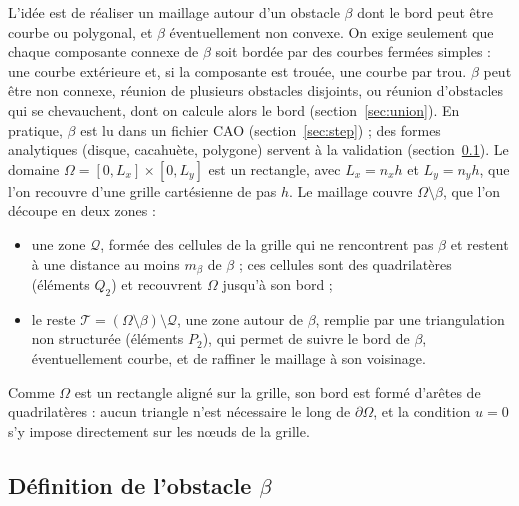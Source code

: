\documentclass[11pt,a4paper]{article}
\begin{document}
L'idée est de réaliser un maillage autour d'un obstacle $\beta$ dont le
bord peut être courbe ou polygonal, et $\beta$ éventuellement non convexe.
On exige seulement que chaque composante connexe de $\beta$ soit bordée par
des courbes fermées simples : une courbe extérieure et, si la composante est
trouée, une courbe par trou. $\beta$ peut être non connexe, réunion de
plusieurs obstacles disjoints, ou réunion d'obstacles qui se chevauchent,
dont on calcule alors le bord (section~\ref{sec:union}). En pratique, $\beta$ est lu dans un fichier
CAO (section~\ref{sec:step}) ; des formes analytiques (disque, cacahuète,
polygone) servent à la validation (section~\ref{sec:beta}). Le
domaine $\Omega = [0, L_x] \times [0, L_y]$ est un rectangle, avec
$L_x = n_x h$ et $L_y = n_y h$, que l'on recouvre d'une grille cartésienne de
pas $h$. Le maillage couvre $\Omega \setminus \beta$, que l'on découpe en deux
zones :
\begin{itemize}
  \item une zone $\mathcal{Q}$, formée des cellules de la grille qui ne
        rencontrent pas $\beta$ et restent à une distance au moins $m_\beta$
        de $\beta$ ; ces cellules sont des quadrilatères (éléments $Q_2$) et
        recouvrent $\Omega$ jusqu'à son bord ;
  \item le reste $\mathcal{T} = (\Omega \setminus \beta) \setminus \mathcal{Q}$,
        une zone autour de $\beta$, remplie par une triangulation non
        structurée (éléments $P_2$), qui permet de suivre le bord de
        $\beta$, éventuellement courbe, et de raffiner le maillage à son voisinage.
\end{itemize}

Comme $\Omega$ est un rectangle aligné sur la grille, son bord est formé
d'arêtes de quadrilatères : aucun triangle n'est nécessaire le long de
$\partial\Omega$, et la condition $u = 0$ s'y impose directement sur les
nœuds de la grille.

\subsection{Définition de l'obstacle $\beta$}
\label{sec:beta}
\end{document}
